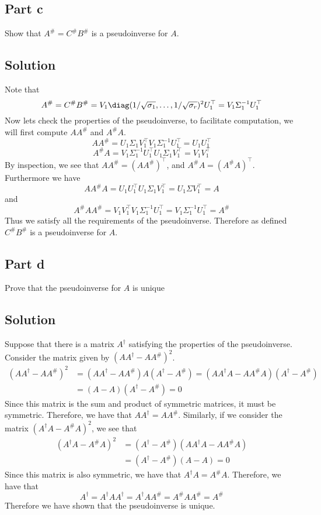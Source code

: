 \documentclass[a4paper]{article}
\begin{document}
\subsection*{Part c}%
Show that $A^\# = C^\#B^\#$ is a pseudoinverse for $A$.

\subsection*{Solution}%
Note that 
\[
  A^{\#} = C^\#B^\# = V_1 \diag(1/\sqrt{\sigma_1}, \dots, 1/\sqrt{\sigma_r})^2 U_1^\top = V_1 \Sigma_1^{-1} U_1^\top
\]
Now lets check the properties of the pseudoinverse, to facilitate computation, we will first compute $AA^\#$ and $A^\#A$.
\[
  AA^\# = U_1\Sigma_1V_1^\top V_1 \Sigma_1^{-1} U_1^\top = U_1U_1^\top
\]
\[
  A^\#A = V_1 \Sigma_1^{-1}U_1^\top U_1 \Sigma_1 V_1^\top = V_1V_1^\top
\]
By inspection, we see that $AA^\# = (AA^\#)^\top$, and $A^\#A = (A^\#A)^\top$. Furthermore we have
\[
  AA^\#A = U_1U_1^\top U_1 \Sigma_1 V_1^\top = U_1\Sigma V_1^\top = A
\]
and
\[
  A^\#AA^\# = V_1V_1^\top V_1\Sigma^{-1}_1 U_1^\top = V_1 \Sigma_1^{-1} U_1^\top = A^\#
\]
Thus we satisfy all the requirements of the pseudoinverse. Therefore as defined $C^\#B^\#$ is a pseudoinverse for $A$.

\subsection*{Part d}%
Prove that the pseudoinverse for $A$ is unique

\subsection*{Solution}%
Suppose that there is a matrix $A^\dagger$ satisfying the properties of the pseudoinverse. Consider the matrix given by $(AA^{\dagger} - AA^\#)^2$.
\[
  \begin{aligned}
    (AA^{\dagger} - AA^\#)^2 &= (AA^{\dagger} - AA^\#)A(A^{\dagger} - A^\#) = (AA^\dagger A - AA^\#A)(A^\dagger - A^\#) \\
                             &= (A - A)(A^\dagger - A^\#) = 0
  \end{aligned}
\]
Since this matrix is the sum and product of symmetric matrices, it must be symmetric. Therefore, we have that $AA^\dagger = AA^\#$. Similarly, if we consider the matrix $(A^{\dagger}A - A^\#A)^2$, we see that
\[
  \begin{aligned}
    (A^{\dagger}A - A^\#A)^2 &= (A^\dagger - A^\#)(AA^\dagger A - AA^\# A)  \\
                             &= (A^\dagger - A^\#)(A - A) = 0 
  \end{aligned}
\]
Since this matrix is also symmetric, we have that $A^\dagger A = A^\#A$. Therefore, we have that
\[
  A^\dagger = A^\dagger A A^\dagger = A^\dagger AA^\# = A^\#A A^\# = A^\#
\]
Therefore we have shown that the pseudoinverse is unique.
\end{document}
